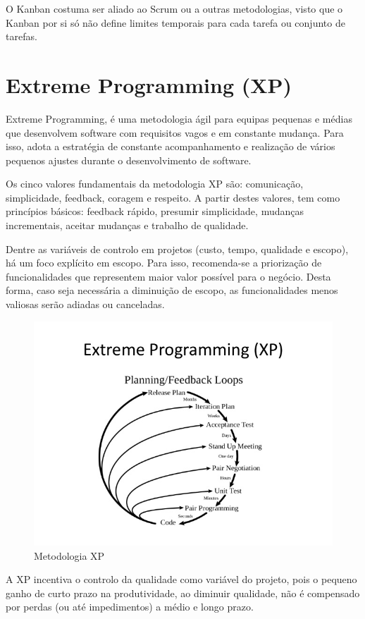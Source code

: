 O Kanban costuma ser aliado ao Scrum ou a outras metodologias, visto que o Kanban por si só não define limites temporais para cada tarefa ou conjunto de tarefas.

\newpage

\section{Extreme Programming (XP)}

Extreme Programming, é uma metodologia ágil para equipas pequenas e médias que desenvolvem software com requisitos vagos e em constante mudança. Para isso, adota a estratégia de constante acompanhamento e realização de vários pequenos ajustes durante o desenvolvimento de software.

Os cinco valores fundamentais da metodologia XP são: comunicação, simplicidade, feedback, coragem e respeito. A partir destes valores, tem como princípios básicos: feedback rápido, presumir simplicidade, mudanças incrementais, aceitar mudanças e trabalho de qualidade.

Dentre as variáveis de controlo em projetos (custo, tempo, qualidade e escopo), há um foco explícito em escopo. Para isso, recomenda-se a priorização de funcionalidades que representem maior valor possível para o negócio. Desta forma, caso seja necessária a diminuição de escopo, as funcionalidades menos valiosas serão adiadas ou canceladas.
\begin{figure}[H]
    \centering
    \includegraphics[scale=0.60]{Imagens/xp.jpg}
    \caption{Metodologia XP}
    \label{fig:scrum}
\end{figure}
A XP incentiva o controlo da qualidade como variável do projeto, pois o pequeno ganho de curto prazo na produtividade, ao diminuir qualidade, não é compensado por perdas (ou até impedimentos) a médio e longo prazo.


